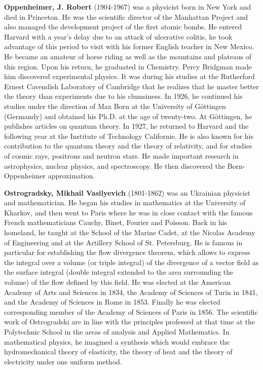 \textbf{Oppenheimer, J. Robert} (1904-1967) was a physicist born in New York and died in Princeton. He was the scientific director of the Manhattan Project and also managed the development project of the first atomic bombs. He entered Harvard with a year's delay due to an attack of ulcerative colitis, he took advantage of this period to visit with his former English teacher in New Mexico. He became an amateur of horse riding as well as the mountains and plateaus of this region. Upon his return, he graduated in Chemistry. Percy Bridgman made him discovered experimental physics. It was during his studies at the Rutherford Ernest Cavendish Laboratory of Cambridge that he realizes that he master better the theory than experiments due to his clumsiness. In 1926, he continued his studies under the direction of Max Born at the University of Göttingen (Germandy) and obtained his Ph.D. at the age of twenty-two. At Göttingen, he publishes articles on quantum theory. In 1927, he returned to Harvard and the following year at the Institute of Technology Californie. He is also known for his contribution to the quantum theory and the theory of relativity, and for studies of cosmic rays, positrons and neutron stars. He made important research in astrophysics, nuclear physics, and spectroscopy. He then discovered the Born-Oppenheimer approximation.

\textbf{Ostrogradsky, Mikhail Vasilyevich} (1801-1862) was an Ukrainian physicist and mathematician. He began his studies in mathematics at the University of Kharkov, and then went to Paris where he was in close contact with the famous French mathematicians Cauchy, Binet, Fourier and Poisson. Back in his homeland, he taught at the School of the Marine Cadet, at the Nicolas Academy of Engineering and at the Artillery School of St. Petersburg. He is famous in particular for establishing the flow divergence theorem, which allows to express the integral over a volume (or triple integral) of the divergence of a vector field as the surface integral (double integral extended to the area surrounding the volume) of the flow defined by this field. He was elected at the American Academy of Arts and Sciences in 1834, the Academy of Sciences of Turin in 1841, and the Academy of Sciences in Rome in 1853. Finally he was elected corresponding member of the Academy of Sciences of Paris in 1856. The scientific work of Ostrogradski are in line with the principles professed at that time at the Polytechnic School in the areas of analysis and Applied Mathematics. In mathematical physics, he imagined a synthesis which would embrace the hydromechanical theory of elasticity, the theory of heat and the theory of electricity under one uniform method.

